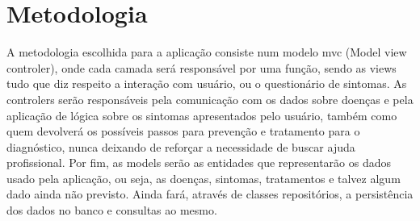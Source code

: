 \section{Metodologia}

A metodologia escolhida para a aplicação consiste num modelo mvc (Model view controler), onde cada camada será responsável por uma função, sendo as views tudo que diz respeito a interação com usuário, ou o questionário de sintomas. As controlers serão responsáveis pela comunicação com os dados sobre doenças e pela aplicação de lógica sobre os sintomas apresentados pelo usuário, também como quem devolverá os possíveis passos para prevenção e tratamento para o diagnóstico, nunca deixando de reforçar a necessidade de buscar ajuda profissional.
Por fim, as models serão as entidades que representarão os dados usado pela aplicação, ou seja, as doenças, sintomas, tratamentos e talvez algum dado ainda não previsto. Ainda fará, através de classes repositórios, a persistência dos dados no banco e consultas ao mesmo.





